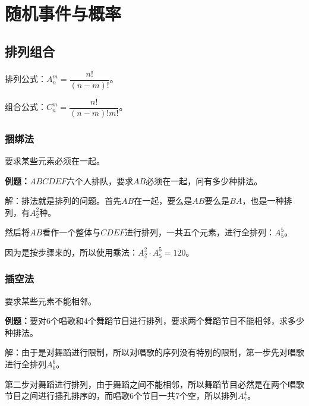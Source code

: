 \setcounter{tocdepth}{4}
\setcounter{secnumdepth}{4}
\renewcommand{\baselinestretch}{1.5}
\chapter{随机事件与概率}

\section{排列组合}

排列公式：$A_n^m=\dfrac{n!}{(n-m)!}$。

组合公式：$C_n^m=\dfrac{n!}{(n-m)!m!}$。

\subsection{捆绑法}

要求某些元素必须在一起。

\textbf{例题：}$ABCDEF$六个人排队，要求$AB$必须在一起，问有多少种排法。

解：排法就是排列的问题。首先$AB$在一起，要么是$AB$要么是$BA$，也是一种排列，有$A_2^2$种。

然后将$AB$看作一个整体与$CDEF$进行排列，一共五个元素，进行全排列：$A_5^5$。

因为是按步骤来的，所以使用乘法：$A_2^2\cdot A_5^5=120$。

\subsection{插空法}

要求某些元素不能相邻。

\textbf{例题：}要对6个唱歌和4个舞蹈节目进行排列，要求两个舞蹈节目不能相邻，求多少种排法。

解：由于是对舞蹈进行限制，所以对唱歌的序列没有特别的限制，第一步先对唱歌进行全排列$A_6^6$。

第二步对舞蹈进行排列，由于舞蹈之间不能相邻，所以舞蹈节目必然是在两个唱歌节目之间进行插孔排序的，而唱歌6个节目一共7个空，所以排列$A_7^4$。

